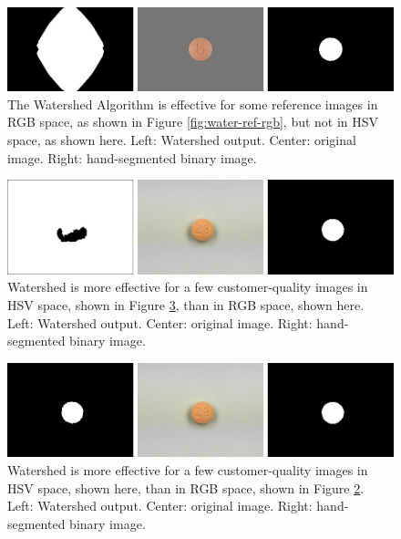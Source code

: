\documentclass{article}
\begin{document}
\begin{figure}
    \includegraphics[width=\linewidth]{images/water_ref_hsv.jpg}
    \caption{The Watershed Algorithm is effective for some reference images in RGB space, as shown in Figure \ref{fig:water-ref-rgb}, but not in HSV space, as shown here. Left: Watershed output. Center: original image. Right: hand-segmented binary image.}
    \label{fig:water-ref-hsv}
\end{figure}

\begin{figure}
    \includegraphics[width=\linewidth]{images/water_cust_rgb.jpg}
    \caption{Watershed is more effective for a few customer-quality images in HSV space, shown in Figure \ref{fig:water-cust-hsv}, than in RGB space, shown here. Left: Watershed output. Center: original image. Right: hand-segmented binary image.}
    \label{fig:water-cust-rgb}
\end{figure}

\begin{figure}
    \includegraphics[width=\linewidth]{images/water_cust_hsv.jpg}
    \caption{Watershed is more effective for a few customer-quality images in HSV space, shown here, than in RGB space, shown in Figure \ref{fig:water-cust-rgb}. Left: Watershed output. Center: original image. Right: hand-segmented binary image.}
    \label{fig:water-cust-hsv}
\end{figure}
\end{document}
